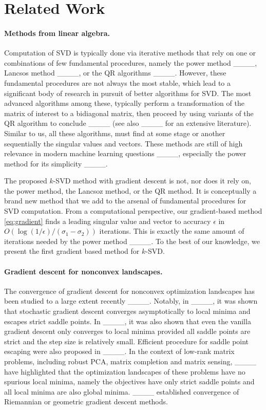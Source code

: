 \section{Related Work}
\label{sec:related}


\paragraph{Methods from linear algebra.} Computation of SVD is typically done via iterative methods that rely on one or combinations of few fundamental procedures, namely the power method ____, Lancsos method ____, or the QR algorithms ____. However, these fundamental procedures are not always the most stable, which lead to a significant body of research in pursuit of better algorithms for SVD. The most advanced algorithms among these, typically perform a transformation of the matrix of interest to a bidiagonal matrix, then proceed by using variants of the QR algorithm to conclude ____ (see also ____ for an extensive literature). Similar to us, all these algorithms, must find at some stage or another sequentially the singular values and vectors. These methods are still of high relevance in modern machine learning questions ____, especially the power method for its simplicity ____.


The proposed $k$-SVD method with gradient descent is not, nor does it rely on, the power  method, the Lancsoz method, or the QR method. It is conceptually a brand new method that we add to the arsenal of fundamental procedures for SVD computation. From a computational perspective, our gradient-based method \eqref{eq:gradient} finds a leading singular value and vector to accuracy $\epsilon$ in $O(\log(1/\epsilon)/(\sigma_1 - \sigma_2))$ iterations. This is exactly the same amount of iterations needed by the power method ____. To the best of our knowledge, we present the first gradient based method for $k$-SVD.  

\paragraph{Gradient descent for nonconvex landscapes.}
The convergence of gradient descent for nonconvex optimization landscapes has been studied to a large extent recently ____. Notably, in ____, it was shown that stochastic gradient descent converges asymptotically to local minima and escapes strict saddle points. In ____, it was also shown that even the vanilla gradient descent only converges to local minima provided all saddle points are strict and the step size is relatively small. Efficient procedure for saddle point escaping were also proposed in ____. In the context of low-rank matrix problems, including robust PCA, matrix completion and matrix sensing, ____ have highlighted that the optimization landscapes of these problems have no spurious local minima, namely the objectives have only strict saddle points and all local minima are also global minima. ____ established convergence of Riemannian or geometric gradient descent methods.  

